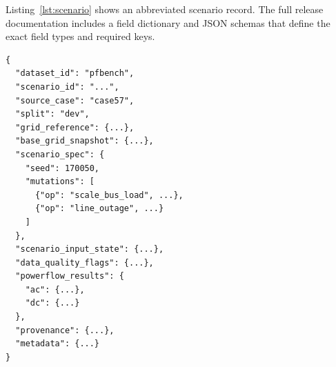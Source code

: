 \begin{table}[!t]
\caption{Query-family taxonomy and grading modes.}
\label{tab:taxonomy}
\centering
{}
\end{table}

Listing~\ref{lst:scenario} shows an abbreviated scenario record. The full release documentation includes a field dictionary and JSON schemas that define the exact field types and required keys.

\begin{lstlisting}[caption={Abbreviated scenario record showing the major top-level keys in the canonical engineering artifact.},label={lst:scenario}]
{
  "dataset_id": "pfbench",
  "scenario_id": "...",
  "source_case": "case57",
  "split": "dev",
  "grid_reference": {...},
  "base_grid_snapshot": {...},
  "scenario_spec": {
    "seed": 170050,
    "mutations": [
      {"op": "scale_bus_load", ...},
      {"op": "line_outage", ...}
    ]
  },
  "scenario_input_state": {...},
  "data_quality_flags": {...},
  "powerflow_results": {
    "ac": {...},
    "dc": {...}
  },
  "provenance": {...},
  "metadata": {...}
}
\end{lstlisting}

